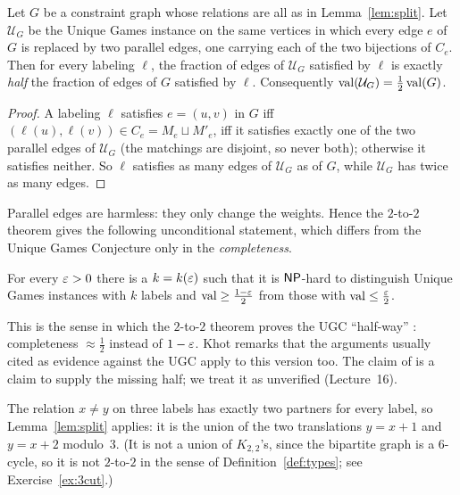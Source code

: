 \begin{corollary}\label{cor:half}
Let $G$ be a constraint graph whose relations are all as in Lemma~\ref{lem:split}.  Let $\mathcal U_G$ be the Unique Games instance on the same vertices
in which every edge $e$ of $G$ is replaced by two parallel edges, one carrying each of the two bijections of $C_e$.  Then for every labeling $\ell$, the fraction of edges of $\mathcal U_G$
satisfied by $\ell$ is exactly \emph{half} the fraction of edges of $G$ satisfied by $\ell$.  Consequently $\operatorname{val}(\mathcal U_G)=\tfrac12\operatorname{val}(G)$.
\end{corollary}
\begin{proof}
A labeling $\ell$ satisfies $e=(u,v)$ in $G$ iff $(\ell(u),\ell(v))\in C_e=M_e\sqcup M'_e$, \ie iff it satisfies exactly one of the two parallel edges of $\mathcal U_G$ (the matchings
are disjoint, so never both); otherwise it satisfies neither.  So $\ell$ satisfies as many edges of $\mathcal U_G$ as of $G$, while $\mathcal U_G$ has twice as many edges.
\end{proof}

\noindent
Parallel edges are harmless: they only change the weights.  Hence the $2$-to-$2$ theorem gives the following unconditional
statement, which differs from the Unique Games Conjecture only in the \emph{completeness}.

\begin{corollary}\label{cor:halfway}
For every $\varepsilon>0$ there is a $k=k(\varepsilon)$ such that it is $\mathsf{NP}$-hard to distinguish Unique Games instances with $k$ labels and $\operatorname{val}\ge\tfrac{1-\varepsilon}2$ from those with $\operatorname{val}\le\tfrac{\varepsilon}2$.
\end{corollary}

\noindent
This is the sense in which the $2$-to-$2$ theorem proves the UGC ``half-way'' \citep{Khot19}: completeness $\approx\tfrac12$ instead of $1-\varepsilon$.  Khot remarks that the arguments usually cited as evidence against the UGC apply to this
version too.  The claim of \citet{OpenAI26} is a claim to supply the missing half; we treat it as unverified (Lecture~16).

\begin{remark}
The relation $x\ne y$ on three labels has exactly two partners for every label, so Lemma~\ref{lem:split} applies: it is the union of the two translations $y=x+1$ and $y=x+2$ modulo~$3$.
(It is not a union of $K_{2,2}$'s, since the bipartite graph is a $6$-cycle, so it is not $2$-to-$2$ in the sense of Definition~\ref{def:types}; see Exercise~\ref{ex:3cut}.)
\end{remark}


